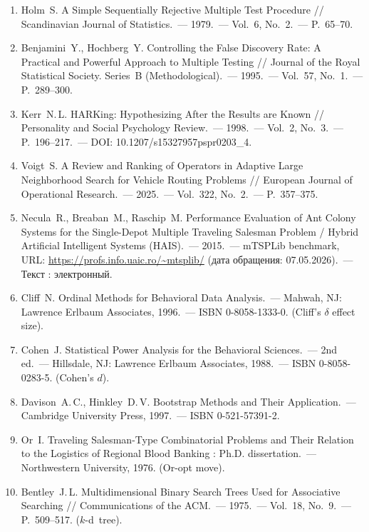 \documentclass[a4paper,14pt]{extreport}
\begin{document}
\begin{enumerate}
\item Holm~S. A Simple Sequentially Rejective Multiple Test Procedure // Scandinavian Journal of Statistics.~--- 1979.~--- Vol.~6, No.~2.~--- P.~65--70.

\item Benjamini~Y., Hochberg~Y. Controlling the False Discovery Rate: A Practical and Powerful Approach to Multiple Testing // Journal of the Royal Statistical Society. Series~B (Methodological).~--- 1995.~--- Vol.~57, No.~1.~--- P.~289--300.

\item Kerr~N.\,L. HARKing: Hypothesizing After the Results are Known // Personality and Social Psychology Review.~--- 1998.~--- Vol.~2, No.~3.~--- P.~196--217.~--- DOI: 10.1207/s15327957pspr0203\_4.

\item Voigt~S. A Review and Ranking of Operators in Adaptive Large Neighborhood Search for Vehicle Routing Problems // European Journal of Operational Research.~--- 2025.~--- Vol.~322, No.~2.~--- P.~357--375.

\item Necula~R., Breaban~M., Raschip~M. Performance Evaluation of Ant Colony Systems for the Single-Depot Multiple Traveling Salesman Problem / Hybrid Artificial Intelligent Systems (HAIS).~--- 2015.~--- mTSPLib benchmark, URL: \url{https://profs.info.uaic.ro/~mtsplib/} (дата обращения: 07.05.2026).~--- Текст : электронный.

\item Cliff~N. Ordinal Methods for Behavioral Data Analysis.~--- Mahwah, NJ: Lawrence Erlbaum Associates, 1996.~--- ISBN 0-8058-1333-0. (Cliff's $\delta$ effect size).

\item Cohen~J. Statistical Power Analysis for the Behavioral Sciences.~--- 2nd ed.~--- Hillsdale, NJ: Lawrence Erlbaum Associates, 1988.~--- ISBN 0-8058-0283-5. (Cohen's $d$).

\item Davison~A.\,C., Hinkley~D.\,V. Bootstrap Methods and Their Application.~--- Cambridge University Press, 1997.~--- ISBN 0-521-57391-2.

\item Or~I. Traveling Salesman-Type Combinatorial Problems and Their Relation to the Logistics of Regional Blood Banking : Ph.D. dissertation.~--- Northwestern University, 1976. (Or-opt move).

\item Bentley~J.\,L. Multidimensional Binary Search Trees Used for Associative Searching // Communications of the ACM.~--- 1975.~--- Vol.~18, No.~9.~--- P.~509--517. ($k$-d~tree).


\end{enumerate}
\end{document}
